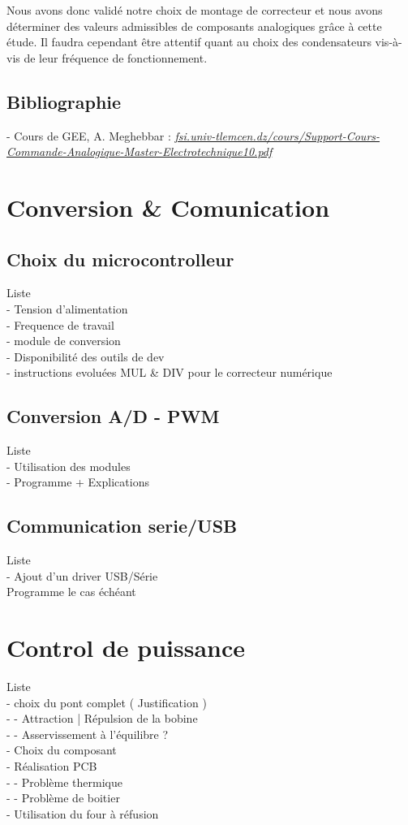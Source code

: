 \documentclass[11pt, french]{article} %
\begin{document}
\noindent
Nous avons donc validé notre choix de montage de correcteur et nous avons déterminer des valeurs admissibles de composants analogiques grâce à cette étude. Il faudra cependant être attentif quant au choix des condensateurs vis-à-vis de leur fréquence de fonctionnement.  

\subsection{Bibliographie}

- Cours de GEE, A. Meghebbar :
\newline \textit{\underline{fsi.univ-tlemcen.dz/cours/Support-Cours-Commande-Analogique-Master-Electrotechnique10.pdf}}


\section{Conversion \& Comunication}
\subsection{Choix du microcontrolleur}
Liste
\\- Tension d'alimentation
\\- Frequence de travail
\\- module de conversion
\\- Disponibilité des outils de dev
\\- instructions evoluées MUL \& DIV pour le correcteur numérique

\subsection{Conversion A/D - PWM}
Liste
\\- Utilisation des modules
\\- Programme + Explications

\subsection{Communication serie/USB}
Liste
\\- Ajout d'un driver USB/Série
\\ Programme le cas échéant

\section{Control de puissance}
Liste
\\- choix du pont complet ( Justification )
\\-  - Attraction | Répulsion de la bobine
\\-  - Asservissement à l'équilibre ?
\\- Choix du composant
\\- Réalisation PCB
\\-  - Problème thermique
\\-  - Problème de boitier
\\- Utilisation du four à réfusion
\end{document}
